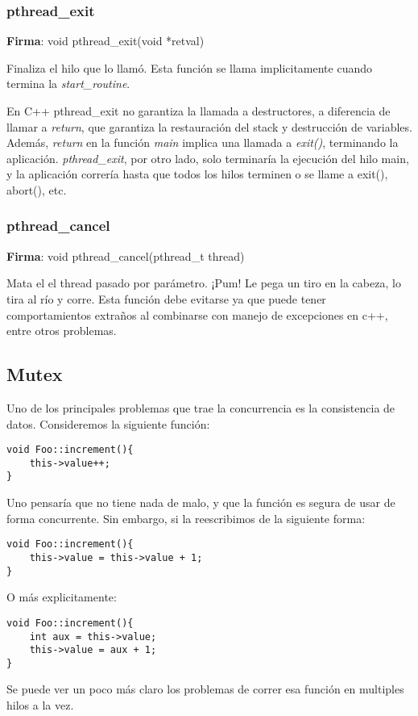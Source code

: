 \documentclass[oneside]{article}
\begin{document}
			\subsubsection{pthread\_exit}
			\textbf{Firma}: void pthread\_exit(void *retval)\par
			Finaliza el hilo que lo llamó. Esta función se llama implicitamente cuando termina la \emph{start\_routine}.

			En C++ pthread\_exit no garantiza la llamada a destructores, a diferencia de llamar a \emph{return}, que garantiza la restauración del stack y destrucción de variables. Además, \emph{return} en la función \emph{main} implica una llamada a \emph{exit()}, terminando la aplicación. \emph{pthread\_exit}, por otro lado, solo terminaría la ejecución del hilo main, y la aplicación correría hasta que todos los hilos terminen o se llame a exit(), abort(), etc.

			\subsubsection{pthread\_cancel}
			\textbf{Firma}: void pthread\_cancel(pthread\_t thread)\par
			Mata el el thread pasado por parámetro. ¡Pum! Le pega un tiro en la cabeza, lo tira al río y corre. Esta función debe evitarse ya que puede tener comportamientos extraños al combinarse con manejo de excepciones en c++, entre otros problemas.\\

		\subsection{Mutex}
			Uno de los principales problemas que trae la concurrencia es la consistencia de datos. Consideremos la siguiente función:
			\begin{lstlisting}
void Foo::increment(){
	this->value++;
}
			\end{lstlisting}
			Uno pensaría que no tiene nada de malo, y que la función es segura de usar de forma concurrente. Sin embargo, si la reescribimos de la siguiente forma:
			\begin{lstlisting}
void Foo::increment(){
	this->value = this->value + 1;
}
			\end{lstlisting}
			O más explicitamente:
			\begin{lstlisting}
void Foo::increment(){
	int aux = this->value;
	this->value = aux + 1;
}
			\end{lstlisting}
			Se puede ver un poco más claro los problemas de correr esa función en multiples hilos a la vez.
\end{document}
